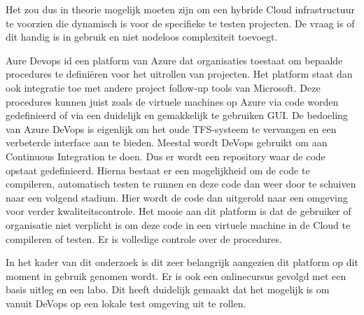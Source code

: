 Het zou dus in theorie mogelijk moeten zijn om een hybride Cloud infrastructuur te voorzien die dynamisch is voor de specifieke te testen projecten. De vraag is of dit handig is in gebruik en niet nodeloos complexiteit toevoegt.

Aure Devops id een platform van Azure dat organisaties toestaat om bepaalde procedures te definiëren voor het uitrollen van projecten. Het platform staat dan ook integratie toe met andere project follow-up tools van Microsoft. Deze procedures kunnen juist zoals de virtuele machines op Azure via code worden gedefinieerd of via een duidelijk en gemakkelijk te gebruiken GUI. De bedoeling van Azure DeVops is eigenlijk om het oude TFS-systeem te vervangen en een verbeterde interface aan te bieden. Meestal wordt DeVops gebruikt om aan Continuous Integration te doen. Dus er wordt een repository waar de code opstaat gedefinieerd. Hierna bestaat er een mogelijkheid om de code te compileren, automatisch testen te runnen en deze code dan weer door te schuiven naar een volgend stadium. Hier wordt de code dan uitgerold naar een omgeving voor verder kwaliteitscontrole. Het mooie aan dit platform is dat de gebruiker of organisatie niet verplicht is om deze code in een virtuele machine in de Cloud te compileren of testen. Er is volledige controle over de procedures.

In het kader van dit onderzoek is dit zeer belangrijk aangezien dit platform op dit moment in gebruik genomen wordt. Er is ook een onlinecursus gevolgd met een basis uitleg en een labo. Dit heeft duidelijk gemaakt dat het mogelijk is om vanuit DeVops op een lokale test omgeving uit te rollen.

